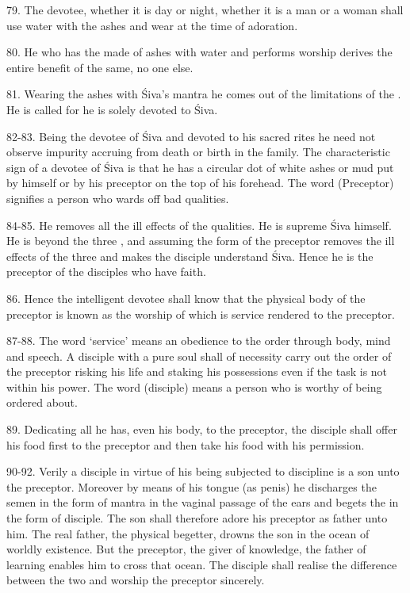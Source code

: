79. The devotee, whether it is day or night, whether it is a man or a woman
shall use water with the ashes and wear  at the time of adoration.

80. He who has the  made of ashes with water and performs worship
derives the entire benefit of the same, no one else.

81. Wearing the ashes with Śiva’s mantra he comes out of the limitations of
the . He is called  for he is solely devoted to Śiva.

82-83. Being the devotee of Śiva and devoted to his sacred rites he need not
observe impurity accruing from death or birth in the family. The characteristic
sign of a devotee of Śiva is that he has a circular dot of white ashes or mud
put by himself or by his preceptor on the top of his forehead. The word 
(Preceptor) signifies a person who wards off bad qualities.

84-85. He removes all the ill effects of the  qualities. He is
supreme Śiva himself. He is beyond the three , and assuming the form
of the preceptor removes the ill effects of the three  and makes
the disciple understand Śiva. Hence he is the preceptor of the disciples who
have faith.

86. Hence the intelligent devotee shall know that the physical body of
the preceptor is known as  the worship of which is service
rendered to the preceptor.

87-88. The word ‘service’ means an obedience to the order through body, mind and
speech. A disciple with a pure soul shall of necessity carry out the order of
the preceptor risking his life and staking his possessions even if the task is
not within his power. The word  (disciple) means a person who is
worthy of being ordered about.

89. Dedicating all he has, even his body, to the preceptor, the disciple shall
offer his food first to the preceptor and then take his food with his permission.

90-92. Verily a disciple in virtue of his being subjected to discipline is a son
unto the preceptor. Moreover by means of his tongue (as penis) he discharges
the semen in the form of mantra in the vaginal passage of the ears and begets
the  in the form of disciple. The son shall therefore adore his
preceptor as father unto him. The real father, the physical begetter, drowns
the son in the ocean of worldly existence. But the preceptor, the giver of
knowledge, the father of learning enables him to cross that ocean. The disciple
shall realise the difference between the two and worship the preceptor sincerely.


